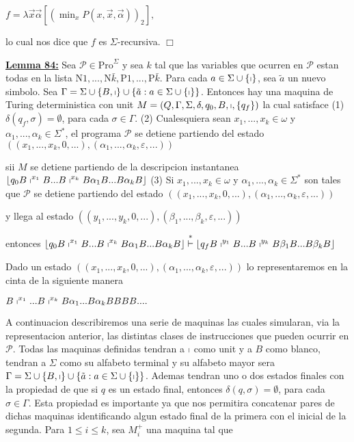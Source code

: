   $\displaystyle f=\lambda \vec{x}\vec{\alpha}\left[ \left( \min_{x}P(x,\vec{x},\vec{\alpha} )\right) _{2}\right] \text{,} $

  lo cual nos dice que $f$ es $\Sigma $-recursiva. $\Box$


  \textbf{\underline{Lemma 84:}} Sea $\mathcal{P}\in \mathrm{Pro}^{\Sigma }$ y sea $k$ tal que las variables que ocurren en $\mathcal{P}$ estan todas en la lista $\mathrm{N}1,..., \mathrm{N}\bar{k},\mathrm{P}1,...,\mathrm{P}\bar{k}.$ Para cada $a\in \Sigma \cup \{\shortmid \}$, sea $\tilde{a}$ un nuevo simbolo. Sea $\Gamma =\Sigma \cup \{B,\shortmid \}\cup \{\tilde{a}:a\in \Sigma \cup \{\shortmid \}\}$. Entonces hay una maquina de Turing deterministica con unit $M=\left( Q,\Gamma ,\Sigma ,\delta ,q_{0},B,\shortmid ,\{q_{f}\}\right) $ la cual satisface
  (1) $\delta (q_{f},\sigma )=\emptyset $, para cada $\sigma \in \Gamma $.
  (2) Cualesquiera sean $x_{1},...,x_{k}\in \omega $ y $\alpha _{1},...,\alpha _{k}\in \Sigma ^{\ast }$, el programa $\mathcal{P}$ se detiene partiendo del estado
  $\displaystyle \left( (x_{1},...,x_{k},0,...),(\alpha _{1},...,\alpha _{k},\varepsilon ,...)\right) $

  sii $M$ se detiene partiendo de la descripcion instantanea
  $\displaystyle \left\lfloor q_{0}B\shortmid ^{x_{1}}B...B\shortmid ^{x_{k}}B\alpha _{1}B...B\alpha _{k}B\right\rfloor $
  (3) Si $x_{1},...,x_{k}\in \omega $ y $\alpha _{1},...,\alpha _{k}\in \Sigma ^{\ast }$ son tales que $\mathcal{P}$ se detiene partiendo del estado
  $\displaystyle \left( (x_{1},...,x_{k},0,...),(\alpha _{1},...,\alpha _{k},\varepsilon ,...)\right) $

  y llega al estado
  $\displaystyle \left( (y_{1},...,y_{k},0,...),(\beta _{1},...,\beta _{k},\varepsilon ,...)\right) $

  entonces
  $\displaystyle \left\lfloor q_{0}B\shortmid ^{x_{1}}B...B\shortmid ^{x_{k}}B\alpha _{1}B...B\alpha _{k}B\right\rfloor \overset{\ast }{\vdash }\left\lfloor q_{f}B\shortmid ^{y_{1}}B...B\shortmid ^{y_{k}}B\beta _{1}B...B\beta _{k}B\right\rfloor $

  \PROOF Dado un estado $((x_{1},...,x_{k},0,...),(\alpha _{1},...,\alpha _{k},\varepsilon ,...))$ lo representaremos en la cinta de la siguiente manera


  $\displaystyle B\shortmid ^{x_{1}}...B\shortmid ^{x_{k}}B\alpha _{1}...B\alpha _{k}BBBB.... $

  A continuacion describiremos una serie de maquinas las cuales simularan, via la representacion anterior, las distintas clases de instrucciones que pueden ocurrir en $\mathcal{P}$. Todas las maquinas definidas tendran a $\shortmid $ como unit y a $B$ como blanco, tendran a $\Sigma $ como su alfabeto terminal y su alfabeto mayor sera $\Gamma =\Sigma \cup \{B,\shortmid \}\cup \{\tilde{a }:a\in \Sigma \cup \{\shortmid \}\}$. Ademas tendran uno o dos estados finales con la propiedad de que si $q$ es un estado final, entonces $\delta (q,\sigma )=\emptyset $, para cada $\sigma \in \Gamma $. Esta propiedad es importante ya que nos permitira concatenar pares de dichas maquinas identificando algun estado final de la primera con el inicial de la segunda.
  Para $1\leq i\leq k$, sea $M_{i}^{+}$ una maquina tal que

